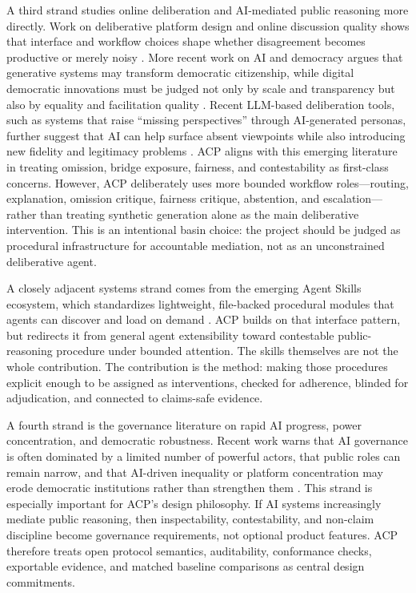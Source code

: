 \documentclass[11pt]{article}
\begin{document}
\vspace{0.1in}
A third strand studies online deliberation and AI-mediated public reasoning more directly. Work on deliberative platform design and online discussion quality shows that interface and workflow choices shape whether disagreement becomes productive or merely noisy \cite{Aragon2017Decidim,King2018OnlineDeliberation}. More recent work on AI and democracy argues that generative systems may transform democratic citizenship, while digital democratic innovations must be judged not only by scale and transparency but also by equality and facilitation quality \cite{Formosa2024DemocraticCitizenship,Mikhaylovskaya2024Enhancing}. Recent LLM-based deliberation tools, such as systems that raise ``missing perspectives'' through AI-generated personas, further suggest that AI can help surface absent viewpoints while also introducing new fidelity and legitimacy problems \cite{Fulay2025EmptyChair}. ACP aligns with this emerging literature in treating omission, bridge exposure, fairness, and contestability as first-class concerns. However, ACP deliberately uses more bounded workflow roles---routing, explanation, omission critique, fairness critique, abstention, and escalation---rather than treating synthetic generation alone as the main deliberative intervention. This is an intentional basin choice: the project should be judged as procedural infrastructure for accountable mediation, not as an unconstrained deliberative agent.

\vspace{0.1in}
A closely adjacent systems strand comes from the emerging Agent Skills ecosystem, which standardizes lightweight, file-backed procedural modules that agents can discover and load on demand \cite{Anthropic2025AgentSkills,AgentSkills2026Overview}. ACP builds on that interface pattern, but redirects it from general agent extensibility toward contestable public-reasoning procedure under bounded attention. The skills themselves are not the whole contribution. The contribution is the method: making those procedures explicit enough to be assigned as interventions, checked for adherence, blinded for adjudication, and connected to claims-safe evidence.

\vspace{0.1in}
A fourth strand is the governance literature on rapid AI progress, power concentration, and democratic robustness. Recent work warns that AI governance is often dominated by a limited number of powerful actors, that public roles can remain narrow, and that AI-driven inequality or platform concentration may erode democratic institutions rather than strengthen them \cite{Ulnicane2024Governance,BellKorinek2023Economic,Verdegem2022AIcapitalism}. This strand is especially important for ACP's design philosophy. If AI systems increasingly mediate public reasoning, then inspectability, contestability, and non-claim discipline become governance requirements, not optional product features. ACP therefore treats open protocol semantics, auditability, conformance checks, exportable evidence, and matched baseline comparisons as central design commitments.
\end{document}
